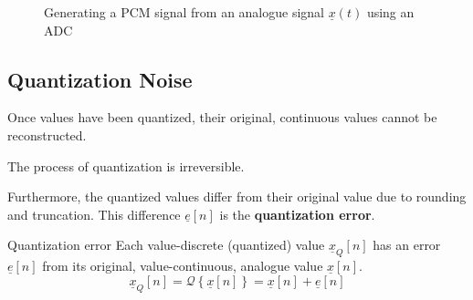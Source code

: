 \begin{refsection}
\begin{figure}[H]
\begin{adjustbox}{scale=0.8}
	\end{adjustbox}
	\caption[Generating a PCM signal from an analogue signal $\underline{x}(t)$ using an ADC]{Generating a \ac{PCM} signal from an analogue signal $\underline{x}(t)$ using an \ac{ADC}}
	\label{fig:ch04:signals_to_data}
\end{figure}

\subsection{Quantization Noise}

Once values have been quantized, their original, continuous values cannot be reconstructed.

\begin{fact}
	The process of quantization is irreversible.
\end{fact}

Furthermore, the quantized values differ from their original value due to rounding and truncation. This difference $\underline{e}[n]$ is the  \textbf{quantization error}.

\begin{definition}{Quantization error}
	Each value-discrete (quantized) value $\underline{x}_Q[n]$ has an error $\underline{e}[n]$ from its original, value-continuous, analogue value $\underline{x}[n]$.
	\begin{equation}
		\underline{x}_Q[n] = \mathcal{Q}\left\{\underline{x}[n]\right\} = \underline{x}[n] + \underline{e}[n]
	\end{equation}
	

\end{definition}
\end{refsection}
